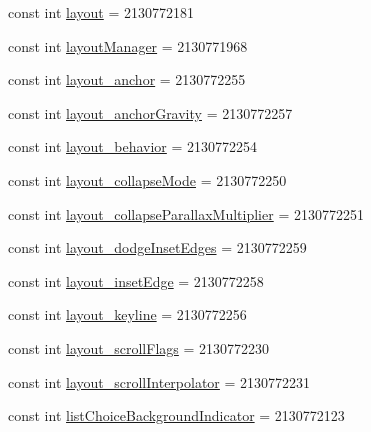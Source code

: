 \begin{DoxyCompactItemize}
const int \mbox{\hyperlink{class_f_w_p_s___app_1_1_droid_1_1_resource_1_1_attribute_a2fe0243cbcd37bdce8bfd267b0dcabc1}{layout}} = 2130772181
\item 
const int \mbox{\hyperlink{class_f_w_p_s___app_1_1_droid_1_1_resource_1_1_attribute_a3da8dbdf785030129ec55eaaba447b28}{layout\+Manager}} = 2130771968
\item 
const int \mbox{\hyperlink{class_f_w_p_s___app_1_1_droid_1_1_resource_1_1_attribute_a850ca153184bac007c780a3a906d10e4}{layout\+\_\+anchor}} = 2130772255
\item 
const int \mbox{\hyperlink{class_f_w_p_s___app_1_1_droid_1_1_resource_1_1_attribute_a32be540fefabd7a196f2d92bcbbfa644}{layout\+\_\+anchor\+Gravity}} = 2130772257
\item 
const int \mbox{\hyperlink{class_f_w_p_s___app_1_1_droid_1_1_resource_1_1_attribute_a1610c02487ccd298eac4e14d45afe3dc}{layout\+\_\+behavior}} = 2130772254
\item 
const int \mbox{\hyperlink{class_f_w_p_s___app_1_1_droid_1_1_resource_1_1_attribute_a276fc82ca88d820c649147c8833f17a7}{layout\+\_\+collapse\+Mode}} = 2130772250
\item 
const int \mbox{\hyperlink{class_f_w_p_s___app_1_1_droid_1_1_resource_1_1_attribute_a2af4fcd630d96941a7a00391ca7b0d27}{layout\+\_\+collapse\+Parallax\+Multiplier}} = 2130772251
\item 
const int \mbox{\hyperlink{class_f_w_p_s___app_1_1_droid_1_1_resource_1_1_attribute_a836774f81fda47a30443a212252eea1a}{layout\+\_\+dodge\+Inset\+Edges}} = 2130772259
\item 
const int \mbox{\hyperlink{class_f_w_p_s___app_1_1_droid_1_1_resource_1_1_attribute_af3230debcc6b806b1c2142f11aaacd48}{layout\+\_\+inset\+Edge}} = 2130772258
\item 
const int \mbox{\hyperlink{class_f_w_p_s___app_1_1_droid_1_1_resource_1_1_attribute_a94816153967feb358d147f606d81ca07}{layout\+\_\+keyline}} = 2130772256
\item 
const int \mbox{\hyperlink{class_f_w_p_s___app_1_1_droid_1_1_resource_1_1_attribute_ac8b9d5ec8153b4fca4f8645cb097c7b2}{layout\+\_\+scroll\+Flags}} = 2130772230
\item 
const int \mbox{\hyperlink{class_f_w_p_s___app_1_1_droid_1_1_resource_1_1_attribute_a104a7419c90efd8f65560eca38e3b298}{layout\+\_\+scroll\+Interpolator}} = 2130772231
\item 
const int \mbox{\hyperlink{class_f_w_p_s___app_1_1_droid_1_1_resource_1_1_attribute_ad6a75549a01fe12294957dc83c4b778e}{list\+Choice\+Background\+Indicator}} = 2130772123

\end{DoxyCompactItemize}
